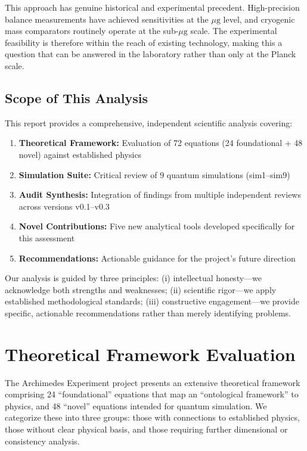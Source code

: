 \documentclass[11pt,a4paper]{article}
\begin{document}
This approach has genuine historical and experimental precedent. High-precision balance measurements have achieved sensitivities at the $\mu\text{g}$ level, and cryogenic mass comparators routinely operate at the sub-$\mu\text{g}$ scale. The experimental feasibility is therefore within the reach of existing technology, making this a question that can be answered in the laboratory rather than only at the Planck scale.

\subsection{Scope of This Analysis}

This report provides a comprehensive, independent scientific analysis covering:

\begin{enumerate}[leftmargin=1.5em]
  \item \textbf{Theoretical Framework:} Evaluation of 72 equations (24 foundational + 48 novel) against established physics
  \item \textbf{Simulation Suite:} Critical review of 9 quantum simulations (sim1--sim9)
  \item \textbf{Audit Synthesis:} Integration of findings from multiple independent reviews across versions v0.1--v0.3
  \item \textbf{Novel Contributions:} Five new analytical tools developed specifically for this assessment
  \item \textbf{Recommendations:} Actionable guidance for the project's future direction
\end{enumerate}

Our analysis is guided by three principles: (i) intellectual honesty---we acknowledge both strengths and weaknesses; (ii) scientific rigor---we apply established methodological standards; (iii) constructive engagement---we provide specific, actionable recommendations rather than merely identifying problems.

\section{Theoretical Framework Evaluation}

The Archimedes Experiment project presents an extensive theoretical framework comprising 24 ``foundational'' equations that map an ``ontological framework'' to physics, and 48 ``novel'' equations intended for quantum simulation. We categorize these into three groups: those with connections to established physics, those without clear physical basis, and those requiring further dimensional or consistency analysis.
\end{document}

